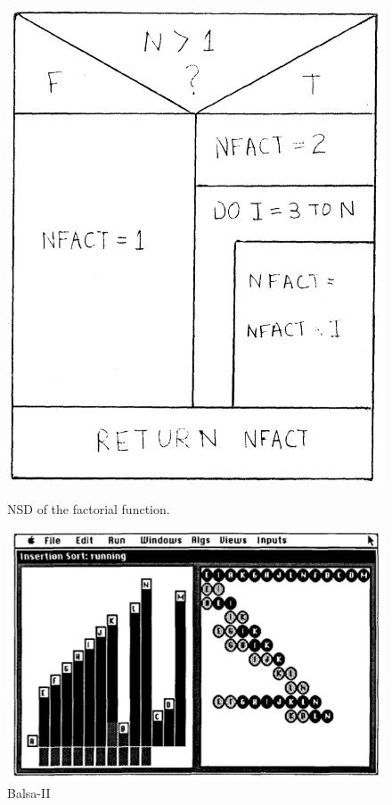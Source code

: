 \begin{figure}[ht]
  \centering
    \includegraphics[width=0.8\linewidth]{Nassi1973_NSD.png}
    \caption{NSD of the factorial function.}
    \label{fig:Nassi1973_NSD}
  \endminipage\hfill
    \centering
    \includegraphics[width=\linewidth]{Brown1988_BalsaII.png}
    \caption{Balsa-II}
    \label{fig:BalsaII}
  \endminipage\hfill
    \centering

\end{figure}
